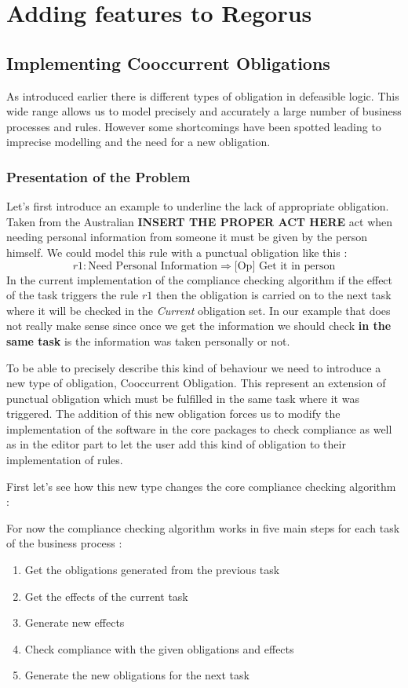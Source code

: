 \documentclass[10pt]{report}
\begin{document}
\newpage
\section{Adding features to Regorus}
\subsection{Implementing Cooccurrent Obligations}
As introduced earlier there is different types of obligation in defeasible logic. This wide range allows us to model precisely and accurately a large number of business processes and rules. However some shortcomings have been spotted leading to imprecise modelling and the need for a new obligation.

\subsubsection{Presentation of the Problem}
Let's first introduce an example to underline the lack of appropriate obligation. Taken from the Australian \textbf{INSERT THE PROPER ACT HERE} act when needing personal information from someone it must be given by the person himself. We could model this rule with a punctual obligation like this :
\begin{equation}
r1 : \text{Need Personal Information} \Rightarrow \text{[Op] Get it in person}
\end{equation}
In the current implementation of the compliance checking algorithm if the effect of the task triggers the rule $r1$ then the obligation is carried on to the next task where it will be checked in the \textit{Current} obligation set. In our example that does not really make sense since once we get the information we should check \textbf{in the same task} is the information was taken personally or not.

To be able to precisely describe this kind of behaviour we need to introduce a new type of obligation, Cooccurrent Obligation. This represent an extension of punctual obligation which must be fulfilled in the same task where it was triggered. The addition of this new obligation forces us to modify the implementation of the software in the core packages to check compliance as well as in the editor part to let the user add this kind of obligation to their implementation of rules.

First let's see how this new type changes the core compliance checking algorithm :

For now the compliance checking algorithm works in five main steps for each task of the business process :
\begin{enumerate}
\item Get the obligations generated from the previous task
\item Get the effects of the current task
\item Generate new effects
\item Check compliance with the given obligations and effects
\item Generate the new obligations for the next task
\end{enumerate}
\end{document}
